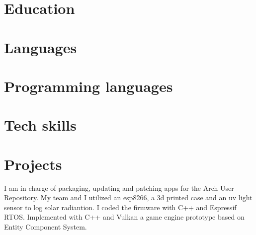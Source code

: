 \documentclass[10pt, a4paper]{moderncv}
\begin{document}
\section{Education}

\section{Languages}

\section{Programming languages}

\section{Tech skills}

\section{Projects}
{
	I am in charge of packaging, updating and patching apps for the Arch User Repository.
}
{
	My team and I utilized an esp8266, a 3d printed case and an uv light sensor to log solar radiantion. I coded the firmware with C++ and Espressif RTOS.
}
{
	Implemented with C++ and Vulkan a game engine prototype based on Entity Component System.
}
\end{document}

